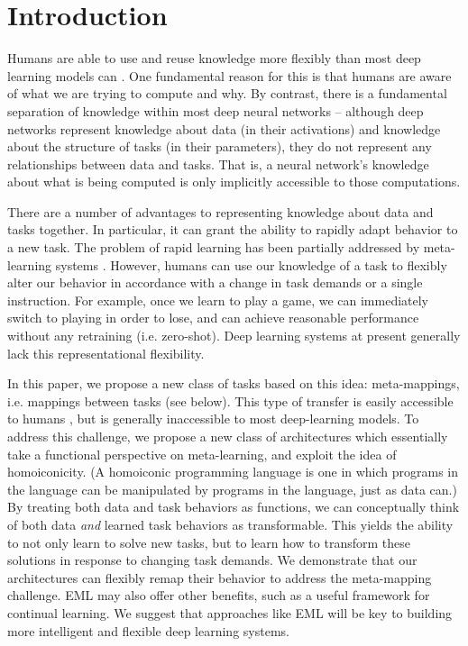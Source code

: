 \documentclass{article}
\begin{document}
\section{Introduction}
\vspace{-0.5em} %
Humans are able to use and reuse knowledge more flexibly than most deep learning models can \citep[e.g.][]{Lake2016, Marcus2018}. One fundamental reason for this is that humans are aware of what we are trying to compute and why. By contrast, there is a fundamental separation of knowledge within most deep neural networks -- although deep networks represent knowledge about data (in their activations) and knowledge about the structure of tasks (in their parameters), they do not represent any relationships between data and tasks. That is, a neural network's knowledge about what is being computed is only implicitly accessible to those computations. \par
{}
There are a number of advantages to representing knowledge about data and tasks together. In particular, it can grant the ability to rapidly adapt behavior to a new task. The problem of rapid learning has been partially addressed by meta-learning systems \citep[e.g.][see also section \ref{sec_discussion}]{Santoro2016, Finn2017a, Finn2018, Stadie2018, Botvinick2019}. However, humans can use our knowledge of a task to flexibly alter our behavior in accordance with a change in task demands or a single instruction. For example, once we learn to play a game, we can immediately switch to playing in order to lose, and can achieve reasonable performance without any retraining (i.e. zero-shot). Deep learning systems at present generally lack this representational flexibility. \par
In this paper, we propose a new class of tasks based on this idea: meta-mappings, i.e. mappings between tasks (see below). This type of transfer is easily accessible to humans \citep{Lake2016}, but is generally inaccessible to most deep-learning models. To address this challenge, we propose a new class of architectures which essentially take a functional perspective on meta-learning, and exploit the idea of homoiconicity. (A homoiconic programming language is one in which programs in the language can be manipulated by programs in the language, just as data can.) By treating both data and task behaviors as functions, we can conceptually think of both data \emph{and} learned task behaviors as transformable. This yields the ability to not only learn to solve new tasks, but to learn how to transform these solutions in response to changing task demands. We demonstrate that our architectures can flexibly remap their behavior to address the meta-mapping challenge. EML may also offer other benefits, such as a useful framework for continual learning. We suggest that approaches like EML will be key to building more intelligent and flexible deep learning systems. \par
\end{document}

